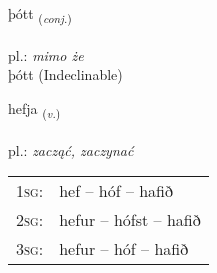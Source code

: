 \documentclass[frontgrid, backgrid]{flacards}\usepackage[]{graphicx}\usepackage[]{xcolor}
\begin{document}

\renewcommand{\flhead}{\vskip5pt \fboxsep=0pt {\small\bfseries\footnotesize Samtenging | Conjuction}}
\renewcommand{\fcfoot}{\vskip5pt \fboxsep=0pt \hspace{2pt}{\small\bfseries\footnotesize 1K}}

\renewcommand{\blhead}{\vskip5pt {\small\bfseries\footnotesize Samtenging | Conjuction }}
\renewcommand{\bcfoot}{\vskip5pt \hspace{2pt}{\small\bfseries\footnotesize 1K}}


{þótt \small{\textsubscript{(\textit{conj.})}} \\[1ex]
\textphonetic{[θouht]} \\
pl.: \emph{mimo że} \\  [2ex]
þótt (Indeclinable)}

\renewcommand{\flhead}{\vskip5pt \fboxsep=0pt {\small\bfseries\footnotesize Sagnorð | Verb}}
\renewcommand{\fcfoot}{\vskip5pt \fboxsep=0pt \hspace{2pt}{\small\bfseries\footnotesize 1K}}

\renewcommand{\blhead}{\vskip5pt {\small\bfseries\footnotesize Sagnorð | Verb }}
\renewcommand{\bcfoot}{\vskip5pt \hspace{2pt}{\small\bfseries\footnotesize 1K}}


{hefja \small{\textsubscript{(\textit{v.})}} \\[1ex] %
\textphonetic{[hɛvja]} \\
pl.: \emph{zacząć, zaczynać} \\  [2ex]
\renewcommand*{\arraystretch}{0.8}
\begin{tabular}{p{1cm}l}
\textsc{1sg}: & hef -- hóf -- hafið \\ 
\textsc{2sg}: & hefur -- hófst -- hafið \\ 
\textsc{3sg}: & hefur -- hóf -- hafið \\ 
\end{tabular}
}

\end{document}
